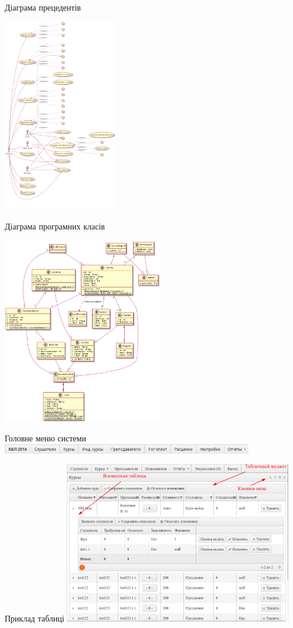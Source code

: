 \documentclass{beamer}
\begin{document}
\begin{frame}{\fn Діаграма прецедентів}
\begin{center}
\includegraphics[width=5cm]{pp_pw1_uc.png}
\end{center}
\end{frame}
\begin{frame}{\fn Діаграма програмних класів}
\begin{center}
\includegraphics[width=7cm]{pp_pw3_clas.png}
\end{center}
\end{frame}
\begin{frame}{\fn Головне меню системи}
\includegraphics[width=11cm]{scrns/menu.png}
\end{frame}
\begin{frame}{\fn Приклад таблиці}
\includegraphics[width=10cm]{scrns/scrn3.png}
\end{frame}
\end{document}
